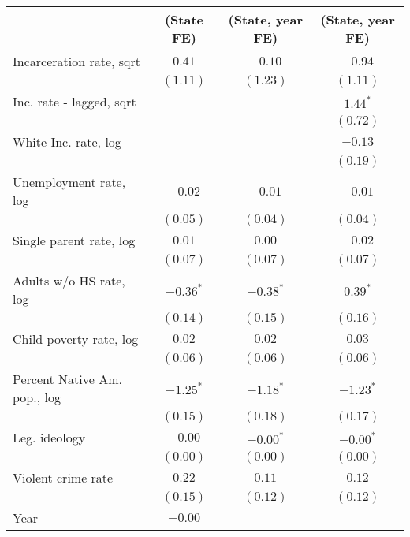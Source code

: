 
\begin{table}
\begin{center}
\label{CL-NatAm}
\begin{tabular}{l c c c}
\hline
&(State FE)&(State, year FE)&(State, year FE)\\
\hline
Incarceration rate, sqrt    & $0.41$      &$-0.10$      &$-0.94$ \\
                            & $(1.11)$    & $(1.23)$       &$(1.11)$\\
Inc. rate - lagged, sqrt    &             &                &$1.44^{*}$\\
                            &             &                &$(0.72)$\\
White Inc. rate, log        &             &                &$-0.13$\\
                            &             &                &$(0.19)$\\
Unemployment rate, log      & $-0.02$     &$-0.01$     &$-0.01$\\
                            & $(0.05)$    & $(0.04)$       &$(0.04)$\\
Single parent rate, log     & $0.01$      & $0.00$         &$-0.02$\\
                            & $(0.07)$    & $(0.07)$       &$(0.07)$\\
Adults w/o HS rate, log     & $-0.36^{*}$ & $-0.38^{*}$         &$0.39^{*}$\\
                            & $(0.14)$    & $(0.15)$       &$(0.16)$\\
Child poverty rate, log     & $0.02$      &  $0.02$       &$0.03$\\
                            & $(0.06)$    &  $(0.06)$        &$(0.06)$\\
Percent Native Am. pop., log& $-1.25^{*}$ & $-1.18^{*}$         &$-1.23^{*}$\\
                            & $(0.15)$    & $(0.18)$       &$(0.17)$\\
Leg. ideology               & $-0.00$     & $-0.00^{*}$        &$-0.00^{*}$\\
                            & $(0.00)$    & $(0.00)$       &$(0.00)$\\
Violent crime rate          & $0.22$      & $0.11$         &$0.12$\\
                            & $(0.15)$    & $(0.12)$       &$(0.12)$\\
Year                        & $-0.00$     &                & \\

\end{tabular}
\end{center}
\end{table}

